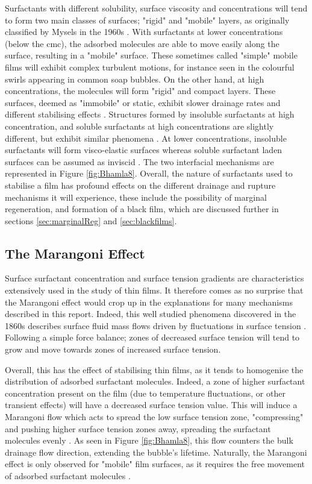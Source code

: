 \documentclass[a4paper,12pt]{article}
\numberwithin{equation}{section}
\numberwithin{figure}{section}
\numberwithin{table}{section}
\begin{document}
Surfactants with different solubility, surface viscosity and concentrations will tend to form two main classes of surfaces; "rigid" and "mobile" layers, as originally classified by Mysels in the 1960s \cite{Mysels1959Book}. With surfactants at lower concentrations (below the cmc), the adsorbed molecules are able to move easily along the surface, resulting in a "mobile" surface. These sometimes called "simple" mobile films \cite{Langevin1994} will exhibit complex turbulent motions, for instance seen in the colourful swirls appearing in common soap bubbles. On the other hand, at high concentrations, the molecules will form "rigid" and compact layers. These surfaces, deemed as "immobile" or static, exhibit slower drainage rates and different stabilising effects \cite{Bhamla2017}. Structures formed by insoluble surfactants at high concentration, and soluble surfactants at high concentrations are slightly different, but exhibit similar phenomena \cite{Bhamla2017, ChampougnyNotBare2016}. At lower concentrations, insoluble surfactants will form visco-elastic surfaces whereas soluble surfactant laden surfaces can be assumed as inviscid \cite{Bhamla2017}. The two interfacial mechanisms are represented in Figure \ref{fig:Bhamla8}. Overall, the nature of surfactants used to stabilise a film has profound effects on the different drainage and rupture mechanisms it will experience, these include the possibility of marginal regeneration, and formation of a black film, which are discussed further in sections \ref{sec:marginalReg} and \ref{sec:blackfilms}.

\subsection{The Marangoni Effect}
\label{sec:marangoni}
Surface surfactant concentration and surface tension gradients are characteristics extensively used in the study of thin films. It therefore comes as no surprise that the Marangoni effect would crop up in the explanations for many mechanisms described in this report. Indeed, this well studied phenomena discovered in the 1860s describes surface fluid mass flows driven by fluctuations in surface tension \cite{Marangoni1965}. Following a simple force balance; zones of decreased surface tension will tend to grow and move towards zones of increased surface tension.

Overall, this has the effect of stabilising thin films, as it tends to homogenise the distribution of adsorbed surfactant molecules. Indeed, a zone of higher surfactant concentration present on the film (due to temperature fluctuations, or other transient effects) will have a decreased surface tension value. This will induce a Marangoni flow which acts to spread the low surface tension zone, "compressing" and pushing higher surface tension zones away, spreading the surfactant molecules evenly \cite{Bhamla2017}. As seen in Figure \ref{fig:Bhamla8}, this flow counters the bulk drainage flow direction, extending the bubble's lifetime. Naturally, the Marangoni effect is only observed for "mobile" film surfaces, as it requires the free movement of adsorbed surfactant molecules \cite{Langevin1994, Nierstrasz1999}.
\end{document}
